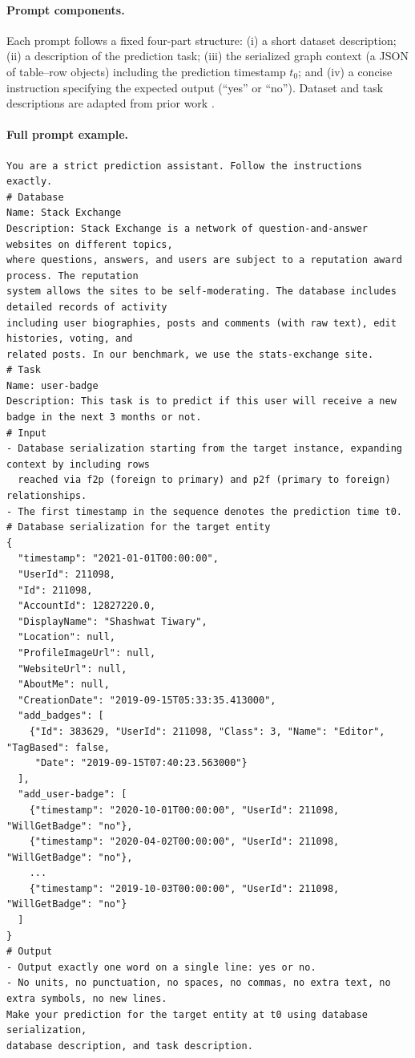 \paragraph{Prompt components.}
Each prompt follows a fixed four-part structure: (i) a short dataset description; (ii) a description of the prediction task; (iii) the serialized graph context (a JSON of table–row objects) including the prediction timestamp \(t_0\); and (iv) a concise instruction specifying the expected output (“yes” or “no”). Dataset and task descriptions are adapted from prior work \citep{relbench}.

\paragraph{Full prompt example.}\mbox{}\par
\begin{lstlisting}[basicstyle=\ttfamily\scriptsize,
  breaklines=true,columns=fullflexible,keepspaces=true,showstringspaces=false]
You are a strict prediction assistant. Follow the instructions exactly.
# Database
Name: Stack Exchange
Description: Stack Exchange is a network of question-and-answer websites on different topics,
where questions, answers, and users are subject to a reputation award process. The reputation
system allows the sites to be self-moderating. The database includes detailed records of activity
including user biographies, posts and comments (with raw text), edit histories, voting, and
related posts. In our benchmark, we use the stats-exchange site.
# Task
Name: user-badge
Description: This task is to predict if this user will receive a new badge in the next 3 months or not.
# Input
- Database serialization starting from the target instance, expanding context by including rows
  reached via f2p (foreign to primary) and p2f (primary to foreign) relationships.
- The first timestamp in the sequence denotes the prediction time t0.
# Database serialization for the target entity
{
  "timestamp": "2021-01-01T00:00:00",
  "UserId": 211098,
  "Id": 211098,
  "AccountId": 12827220.0,
  "DisplayName": "Shashwat Tiwary",
  "Location": null,
  "ProfileImageUrl": null,
  "WebsiteUrl": null,
  "AboutMe": null,
  "CreationDate": "2019-09-15T05:33:35.413000",
  "add_badges": [
    {"Id": 383629, "UserId": 211098, "Class": 3, "Name": "Editor", "TagBased": false,
     "Date": "2019-09-15T07:40:23.563000"}
  ],
  "add_user-badge": [
    {"timestamp": "2020-10-01T00:00:00", "UserId": 211098, "WillGetBadge": "no"},
    {"timestamp": "2020-04-02T00:00:00", "UserId": 211098, "WillGetBadge": "no"},
    ...
    {"timestamp": "2019-10-03T00:00:00", "UserId": 211098, "WillGetBadge": "no"}
  ]
}
# Output
- Output exactly one word on a single line: yes or no.
- No units, no punctuation, no spaces, no commas, no extra text, no extra symbols, no new lines.
Make your prediction for the target entity at t0 using database serialization,
database description, and task description.
\end{lstlisting}



